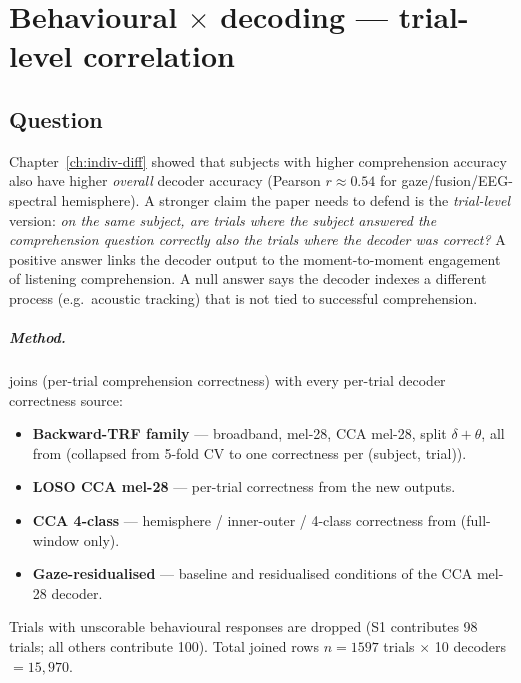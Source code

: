 \chapter{Behavioural $\times$ decoding --- trial-level correlation}
\label{ch:behaviour-decoding}

\section{Question}

Chapter~\ref{ch:indiv-diff} showed that subjects with higher
comprehension accuracy also have higher \emph{overall} decoder accuracy
(Pearson $r \approx 0.54$ for gaze/fusion/EEG-spectral hemisphere).
A stronger claim the paper needs to defend is the \emph{trial-level}
version: \textit{on the same subject, are trials where the subject
answered the comprehension question correctly also the trials where
the decoder was correct?} A positive answer links the decoder output to
the moment-to-moment engagement of listening comprehension. A null
answer says the decoder indexes a different process (e.g.\ acoustic
tracking) that is not tied to successful comprehension.

\paragraph{Method.}
 joins
 (per-trial comprehension
correctness) with every per-trial decoder correctness source:
\begin{itemize}
  \item \textbf{Backward-TRF family} --- broadband, mel-28, CCA mel-28,
        split $\delta+\theta$, all from
         (collapsed from
        5-fold CV to one correctness per (subject, trial)).
  \item \textbf{LOSO CCA mel-28} --- per-trial correctness from the
        new  outputs.
  \item \textbf{CCA 4-class} --- hemisphere / inner-outer / 4-class
        correctness from 
        (full-window only).
  \item \textbf{Gaze-residualised} --- baseline and residualised
        conditions of the CCA mel-28 decoder.
\end{itemize}

Trials with unscorable behavioural responses are dropped (S1
contributes 98 trials; all others contribute 100). Total joined rows
$n = 1597$ trials $\times$ 10 decoders $= 15{,}970$.

